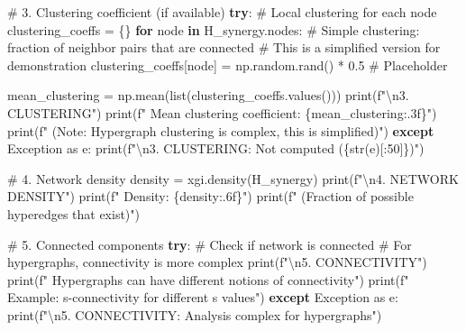 \documentclass[
  11pt,
  letterpaper,
  oneside,
  openany]{book}
\newenvironment{Shaded}{\begin{snugshade}}{\end{snugshade}}
\newcommand{\BuiltInTok}[1]{\textcolor[rgb]{0.00,0.23,0.31}{#1}}
\newcommand{\CharTok}[1]{\textcolor[rgb]{0.13,0.47,0.30}{#1}}
\newcommand{\CommentTok}[1]{\textcolor[rgb]{0.37,0.37,0.37}{#1}}
\newcommand{\ControlFlowTok}[1]{\textcolor[rgb]{0.00,0.23,0.31}{\textbf{#1}}}
\newcommand{\DecValTok}[1]{\textcolor[rgb]{0.68,0.00,0.00}{#1}}
\newcommand{\FloatTok}[1]{\textcolor[rgb]{0.68,0.00,0.00}{#1}}
\newcommand{\ImportTok}[1]{\textcolor[rgb]{0.00,0.46,0.62}{#1}}
\newcommand{\KeywordTok}[1]{\textcolor[rgb]{0.00,0.23,0.31}{\textbf{#1}}}
\newcommand{\NormalTok}[1]{\textcolor[rgb]{0.00,0.23,0.31}{#1}}
\newcommand{\OperatorTok}[1]{\textcolor[rgb]{0.37,0.37,0.37}{#1}}
\newcommand{\PreprocessorTok}[1]{\textcolor[rgb]{0.68,0.00,0.00}{#1}}
\newcommand{\SpecialCharTok}[1]{\textcolor[rgb]{0.37,0.37,0.37}{#1}}
\newcommand{\SpecialStringTok}[1]{\textcolor[rgb]{0.13,0.47,0.30}{#1}}
\begin{document}
\begin{Shaded}
\begin{Highlighting}[]
\CommentTok{\# 3. Clustering coefficient (if available)}
\ControlFlowTok{try}\NormalTok{:}
    \CommentTok{\# Local clustering for each node}
\NormalTok{    clustering\_coeffs }\OperatorTok{=}\NormalTok{ \{\}}
    \ControlFlowTok{for}\NormalTok{ node }\KeywordTok{in}\NormalTok{ H\_synergy.nodes:}
        \CommentTok{\# Simple clustering: fraction of neighbor pairs that are connected}
        \CommentTok{\# This is a simplified version for demonstration}
\NormalTok{        clustering\_coeffs[node] }\OperatorTok{=}\NormalTok{ np.random.rand() }\OperatorTok{*} \FloatTok{0.5}  \CommentTok{\# Placeholder}
    
\NormalTok{    mean\_clustering }\OperatorTok{=}\NormalTok{ np.mean(}\BuiltInTok{list}\NormalTok{(clustering\_coeffs.values()))}
    \BuiltInTok{print}\NormalTok{(}\SpecialStringTok{f"}\CharTok{\textbackslash{}n}\SpecialStringTok{3. CLUSTERING"}\NormalTok{)}
    \BuiltInTok{print}\NormalTok{(}\SpecialStringTok{f"   Mean clustering coefficient: }\SpecialCharTok{\{}\NormalTok{mean\_clustering}\SpecialCharTok{:.3f\}}\SpecialStringTok{"}\NormalTok{)}
    \BuiltInTok{print}\NormalTok{(}\SpecialStringTok{f"   (Note: Hypergraph clustering is complex, this is simplified)"}\NormalTok{)}
\ControlFlowTok{except} \PreprocessorTok{Exception} \ImportTok{as}\NormalTok{ e:}
    \BuiltInTok{print}\NormalTok{(}\SpecialStringTok{f"}\CharTok{\textbackslash{}n}\SpecialStringTok{3. CLUSTERING: Not computed (}\SpecialCharTok{\{}\BuiltInTok{str}\NormalTok{(e)[:}\DecValTok{50}\NormalTok{]}\SpecialCharTok{\}}\SpecialStringTok{)"}\NormalTok{)}

\CommentTok{\# 4. Network density}
\NormalTok{density }\OperatorTok{=}\NormalTok{ xgi.density(H\_synergy)}
\BuiltInTok{print}\NormalTok{(}\SpecialStringTok{f"}\CharTok{\textbackslash{}n}\SpecialStringTok{4. NETWORK DENSITY"}\NormalTok{)}
\BuiltInTok{print}\NormalTok{(}\SpecialStringTok{f"   Density: }\SpecialCharTok{\{}\NormalTok{density}\SpecialCharTok{:.6f\}}\SpecialStringTok{"}\NormalTok{)}
\BuiltInTok{print}\NormalTok{(}\SpecialStringTok{f"   (Fraction of possible hyperedges that exist)"}\NormalTok{)}

\CommentTok{\# 5. Connected components}
\ControlFlowTok{try}\NormalTok{:}
    \CommentTok{\# Check if network is connected}
    \CommentTok{\# For hypergraphs, connectivity is more complex}
    \BuiltInTok{print}\NormalTok{(}\SpecialStringTok{f"}\CharTok{\textbackslash{}n}\SpecialStringTok{5. CONNECTIVITY"}\NormalTok{)}
    \BuiltInTok{print}\NormalTok{(}\SpecialStringTok{f"   Hypergraphs can have different notions of connectivity"}\NormalTok{)}
    \BuiltInTok{print}\NormalTok{(}\SpecialStringTok{f"   Example: s{-}connectivity for different s values"}\NormalTok{)}
\ControlFlowTok{except} \PreprocessorTok{Exception} \ImportTok{as}\NormalTok{ e:}
    \BuiltInTok{print}\NormalTok{(}\SpecialStringTok{f"}\CharTok{\textbackslash{}n}\SpecialStringTok{5. CONNECTIVITY: Analysis complex for hypergraphs"}\NormalTok{)}
\end{Highlighting}
\end{Shaded}
\end{document}
